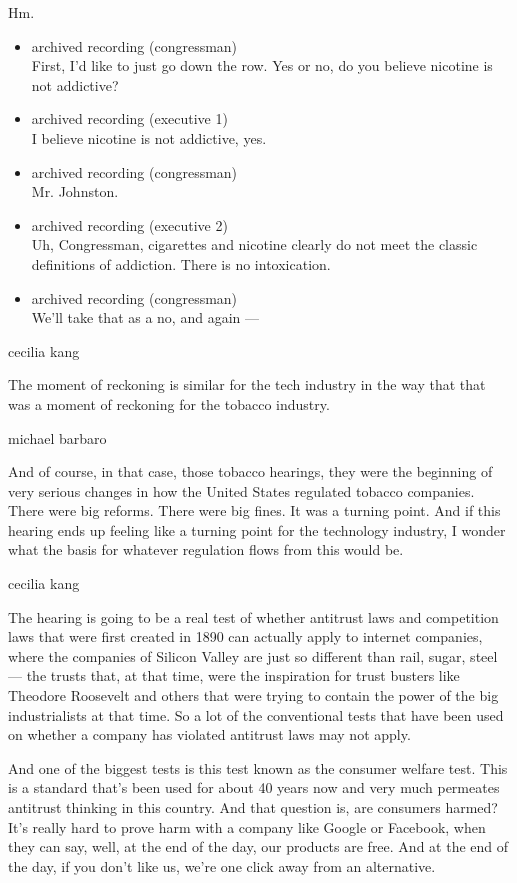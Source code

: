 Hm.

\begin{itemize}
\item
  archived recording (congressman)\\
  First, I'd like to just go down the row. Yes or no, do you believe
  nicotine is not addictive?
\item
  archived recording (executive 1)\\
  I believe nicotine is not addictive, yes.
\item
  archived recording (congressman)\\
  Mr. Johnston.
\item
  archived recording (executive 2)\\
  Uh, Congressman, cigarettes and nicotine clearly do not meet the
  classic definitions of addiction. There is no intoxication.
\item
  archived recording (congressman)\\
  We'll take that as a no, and again ---
\end{itemize}

cecilia kang

The moment of reckoning is similar for the tech industry in the way that
that was a moment of reckoning for the tobacco industry.

michael barbaro

And of course, in that case, those tobacco hearings, they were the
beginning of very serious changes in how the United States regulated
tobacco companies. There were big reforms. There were big fines. It was
a turning point. And if this hearing ends up feeling like a turning
point for the technology industry, I wonder what the basis for whatever
regulation flows from this would be.

cecilia kang

The hearing is going to be a real test of whether antitrust laws and
competition laws that were first created in 1890 can actually apply to
internet companies, where the companies of Silicon Valley are just so
different than rail, sugar, steel --- the trusts that, at that time,
were the inspiration for trust busters like Theodore Roosevelt and
others that were trying to contain the power of the big industrialists
at that time. So a lot of the conventional tests that have been used on
whether a company has violated antitrust laws may not apply.

And one of the biggest tests is this test known as the consumer welfare
test. This is a standard that's been used for about 40 years now and
very much permeates antitrust thinking in this country. And that
question is, are consumers harmed? It's really hard to prove harm with a
company like Google or Facebook, when they can say, well, at the end of
the day, our products are free. And at the end of the day, if you don't
like us, we're one click away from an alternative.


